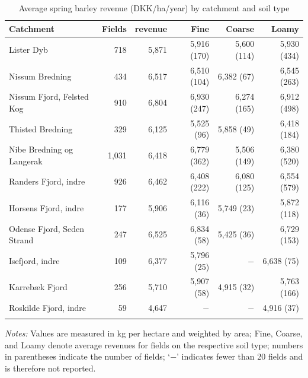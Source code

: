 \documentclass[12pt]{article}
\begin{document}
\begin{table}[H]
\centering
\small
\caption{Average spring barley revenue (DKK/ha/year) by catchment and soil type}
\label{tab:yield-vaarbyg}
\begin{threeparttable}
\begin{tabular}{lrrrrr}
\toprule
\textbf{Catchment} & \textbf{Fields} & \textbf{revenue} &
\textbf{Fine} & \textbf{Coarse} & \textbf{Loamy} \\
\midrule\addlinespace
Lister Dyb                 & 718  & 5,871 & 5,916 (170) & 5,600 (114) & 5,930 (434) \\
Nissum Bredning            & 434  & 6,517 & 6,510 (104) & 6,382 (67)  & 6,545 (263) \\
Nissum Fjord, Felsted Kog  & 910  & 6,804 & 6,930 (247) & 6,274 (165) & 6,912 (498) \\
Thisted Bredning           & 329  & 6,125 & 5,525 (96)  & 5,858 (49)  & 6,418 (184) \\
Nibe Bredning og Langerak  & 1,031& 6,418 & 6,779 (362) & 5,506 (149) & 6,380 (520) \\
Randers Fjord, indre       & 926  & 6,462 & 6,408 (222) & 6,080 (125) & 6,554 (579) \\
Horsens Fjord, indre       & 177  & 5,906 & 6,116 (36)  & 5,749 (23)  & 5,872 (118) \\
Odense Fjord, Seden Strand & 247  & 6,525 & 6,834 (58)  & 5,425 (36)  & 6,729 (153) \\
Isefjord, indre            & 109  & 6,377 & 5,796 (25)  & $-$          & 6,638 (75) \\
Karrebæk Fjord             & 256  & 5,710 & 5,907 (58)  & 4,915 (32)  & 5,763 (166) \\
Roskilde Fjord, indre      & 59   & 4,647 & $-$          & $-$          & 4,916 (37) \\
\addlinespace\bottomrule
\end{tabular}
\begin{tablenotes}
\footnotesize
\item \textit{Notes:} Values are measured in kg per hectare and weighted by area;
Fine, Coarse, and Loamy denote average revenues for fields on the respective soil type;
numbers in parentheses indicate the number of fields; `$-$' indicates fewer than 20 fields and is therefore not reported.
\end{tablenotes}
\end{threeparttable}
\end{table}
\end{document}
